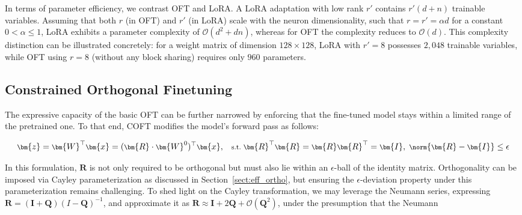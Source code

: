 In terms of parameter efficiency, we contrast OFT and LoRA. A LoRA adaptation with low rank $r'$ contains $r'(d+n)$ trainable variables. Assuming that both $r$ (in OFT) and $r'$ (in LoRA) scale with the neuron dimensionality, such that $r = r' = \alpha d$ for a constant $0 < \alpha \leq 1$, LoRA exhibits a parameter complexity of $\mathcal{O}(d^2 + dn)$, whereas for OFT the complexity reduces to $\mathcal{O}(d)$. This complexity distinction can be illustrated concretely: for a weight matrix of dimension $128\times 128$, LoRA with $r'=8$ possesses $2,048$ trainable variables, while OFT using $r=8$ (without any block sharing) requires only $960$ parameters.

\subsection{Constrained Orthogonal Finetuning}

The expressive capacity of the basic OFT can be further narrowed by enforcing that the fine-tuned model stays within a limited range of the pretrained one. To that end, COFT modifies the model’s forward pass as follows:

\begin{equation}\label{eq:coft_general}
    \footnotesize
    \bm{z}=\bm{W}^\top\bm{x}=(\bm{R}\cdot\bm{W}^0)^\top\bm{x},~~~\text{s.t.}~\bm{R}^\top\bm{R}=\bm{R}\bm{R}^\top=\bm{I},~\norm{\bm{R}-\bm{I}}\leq \epsilon
\end{equation}

In this formulation, $\bm{R}$ is not only required to be orthogonal but must also lie within an $\epsilon$-ball of the identity matrix. Orthogonality can be imposed via Cayley parameterization as discussed in Section~\ref{sect:eff_ortho}, but ensuring the $\epsilon$-deviation property under this parameterization remains challenging. To shed light on the Cayley transformation, we may leverage the Neumann series, expressing $\bm{R}=(\bm{I}+\bm{Q})(I-\bm{Q})^{-1}$, and approximate it as $\bm{R}\approx\bm{I}+2\bm{Q}+\mathcal{O}(\bm{Q}^2)$, under the presumption that the Neumann

